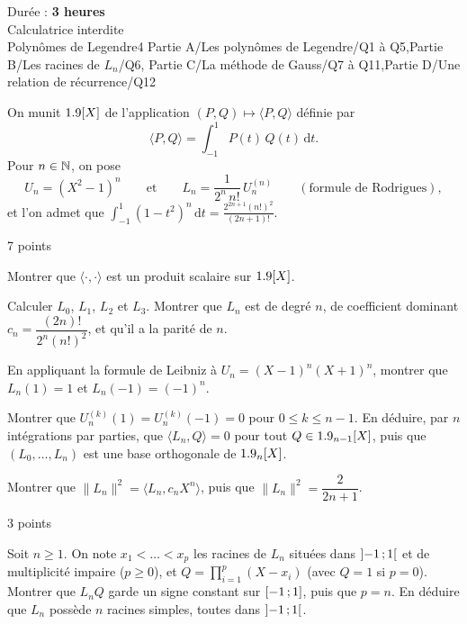 
  {Durée : \textbf{3 heures}\\Calculatrice interdite\\Polynômes de Legendre}{4}
  {Partie A/Les polynômes de Legendre/Q1 à Q5,Partie B/Les racines de $L_n$/Q6,%
   Partie C/La méthode de Gauss/Q7 à Q11,Partie D/Une relation de récurrence/Q12}
\enParties
{}

On munit $1.9[X]$ de l'application $(P,Q)\mapsto\langle P,Q\rangle$
définie par
\[\langle P,Q\rangle=\int_{-1}^{1}P(t)\,Q(t)\,\mathrm{d}t.\]
Pour $n\in\mathbb{N}$, on pose
\[U_n=(X^{2}-1)^{n}\qquad\text{et}\qquad L_n=\frac{1}{2^{n}\,n!}\,U_n^{(n)}
  \qquad(\text{formule de Rodrigues}),\]
et l'on admet que
$\displaystyle\int_{-1}^{1}(1-t^{2})^{n}\,\mathrm{d}t=\frac{2^{2n+1}(n!)^{2}}{(2n+1)!}$.

\begin{exoEval}{7 points}{}
\begin{questions}
  \item Montrer que $\langle\cdot,\cdot\rangle$ est un produit scalaire sur
    $1.9[X]$.
  \item Calculer $L_0$, $L_1$, $L_2$ et $L_3$. Montrer que $L_n$ est de degré
    $n$, de coefficient dominant $c_n=\dfrac{(2n)!}{2^{n}(n!)^{2}}$, et qu'il a
    la parité de $n$.
  \item En appliquant la formule de Leibniz à $U_n=(X-1)^{n}(X+1)^{n}$,
    montrer que $L_n(1)=1$ et $L_n(-1)=(-1)^{n}$.
  \item Montrer que $U_n^{(k)}(1)=U_n^{(k)}(-1)=0$ pour $0\leqslant k\leqslant n-1$.
    En déduire, par $n$ intégrations par parties, que
    $\langle L_n,Q\rangle=0$ pour tout $Q\in1.9_{n-1}[X]$, puis que
    $(L_0,\dots,L_n)$ est une base orthogonale de $1.9_n[X]$.
  \item Montrer que $\lVert L_n\rVert^{2}=\langle L_n,c_nX^{n}\rangle$, puis
    que $\lVert L_n\rVert^{2}=\dfrac{2}{2n+1}$.
\end{questions}
\end{exoEval}

\begin{exoEval}{3 points}{}
\begin{questions}[start=6]
  \item Soit $n\geqslant1$. On note $x_1<\dots<x_p$ les racines de $L_n$
    situées dans $\mathopen{]}-1\,{;}\,1\mathclose{[}$ et de multiplicité impaire ($p\geqslant0$),
    et $Q=\prod_{i=1}^{p}(X-x_i)$ (avec $Q=1$ si $p=0$). Montrer que $L_nQ$
    garde un signe constant sur $\mathopen{[}-1\,{;}\,1\mathclose{]}$, puis que $p=n$. En déduire
    que $L_n$ possède $n$ racines simples, toutes dans $\mathopen{]}-1\,{;}\,1\mathclose{[}$.
\end{questions}
\end{exoEval}


